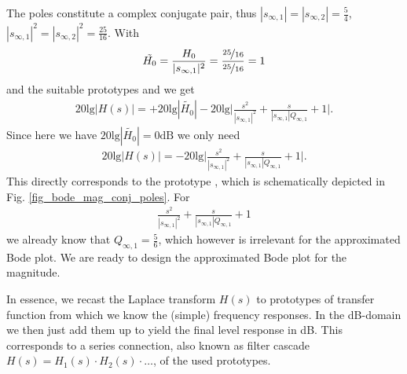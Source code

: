 \begin{ExCalc}
The poles constitute a complex conjugate pair, thus
$|s_{\infty,1}| = |s_{\infty,2}| = \frac{5}{4}$, $|s_{\infty,1}|^2 = |s_{\infty,2}|^2 = \frac{25}{16}$.
%
With 
\begin{align}
\tilde{H_0} = \frac{H_0}{|s_{\infty,1}|^2} = \frac{\nicefrac{25}{16}}{\nicefrac{25}{16}} = 1
\end{align}
and the suitable prototypes  and 
we get
\begin{align}
20 \text{lg} |H(s)| =
+20 \text{lg} |\tilde{H_0}|
-20 \text{lg} \bigg|\frac{s^2}{|s_{\infty,1}|^2} + \frac{s}{|s_{\infty,1}| Q_{\infty,1}} + 1\bigg|.
\end{align}
Since here we have $20 \text{lg} |\tilde{H_0}|=0\mathrm{dB}$ we only need
\begin{align}
20 \text{lg} |H(s)| =
-20 \text{lg} \bigg|\frac{s^2}{|s_{\infty,1}|^2} + \frac{s}{|s_{\infty,1}| Q_{\infty,1}} + 1\bigg|.
\end{align}
This directly corresponds to the prototype , which
is schematically depicted in Fig. \ref{fig_bode_mag_conj_poles}.
For
\begin{align}
\frac{s^2}{|s_{\infty,1}|^2} + \frac{s}{|s_{\infty,1}| Q_{\infty,1}} + 1
\end{align}
we already know that $Q_{\infty,1}=\frac{5}{6}$, which however is irrelevant for the
approximated Bode plot.
%
%
We are ready to design the approximated Bode plot for the magnitude.

In essence, we recast the Laplace transform $H(s)$ to prototypes of transfer function
from which we know the (simple) frequency responses. In the dB-domain
we then just add them up to yield the final level response in dB.
This corresponds to a series connection, also known as filter cascade
$H(s)=H_1(s)\cdot H_2(s)\cdot\dots$, of the used prototypes.

%
\end{ExCalc}
